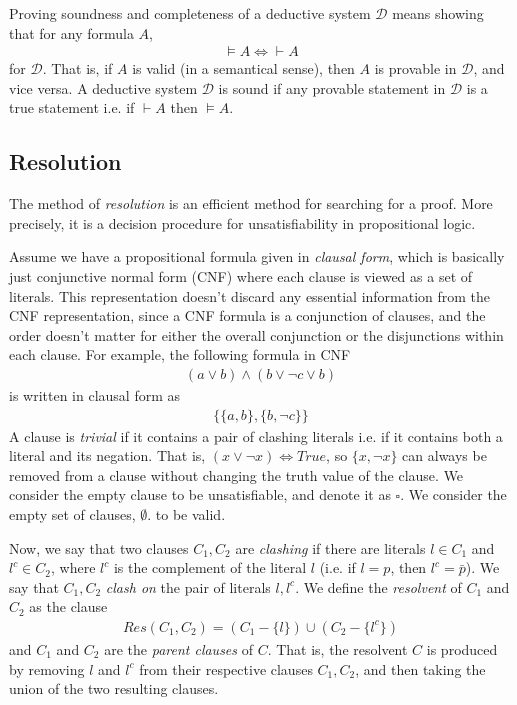 \documentclass[10pt]{article}
\begin{document}
Proving soundness and completeness of a deductive system $\mathcal{D}$ means showing that for any formula $A$, 
\begin{align*}
    \vDash A \iff \vdash A  
\end{align*}
for $\mathcal{D}$. That is, if $A$ is valid (in a semantical sense), then $A$ is provable in $\mathcal{D}$, and vice versa. A deductive system $\mathcal{D}$ is sound if any provable statement in $\mathcal{D}$ is a true statement i.e. if $\vdash A$ then  $\vDash A$.

\subsection{Resolution}

The method of \textit{resolution} is an efficient method for searching for a proof. More precisely, it is a decision procedure for unsatisfiability in propositional logic. 

Assume we have a propositional formula given in \textit{clausal form}, which is basically just conjunctive normal form (CNF) where each clause is viewed as a set of literals. This representation doesn't discard any essential information from the CNF representation, since a CNF formula is a conjunction of clauses, and the order doesn't matter for either the overall conjunction or the disjunctions within each clause. For example, the following formula in CNF
\begin{align*}
    (a \vee b) \wedge (b \vee \neg c \vee b)
\end{align*}
is written in clausal form as
\begin{align*}
    \{\{a,b\},\{b,\neg c\}\}
\end{align*}
A clause is \textit{trivial} if it contains a pair of clashing literals i.e. if it contains both a literal and its negation. That is, $(x \vee \neg x) \iff True$, so $\{x, \neg x\}$ can always be removed from a clause without changing the truth value of the clause. We consider the empty clause to be unsatisfiable, and denote it as $\square$. We consider the empty set of clauses, $\emptyset$. to be valid.

Now, we say that two clauses $C_1,C_2$ are \textit{clashing} if there are literals $l \in C_1$ and $l^c \in C_2$, where $l^c$ is the complement of the literal $l$ (i.e. if $l=p$, then $l^c=\bar{p}$). We say that $C_1,C_2$ \textit{clash on} the pair of literals $l,l^c$. We define the \textit{resolvent} of $C_1$ and $C_2$ as the clause 
\begin{align*}
Res(C_1,C_2) = (C_1 - \{l\}) \cup (C_2 - \{l^c\})    
\end{align*}
and $C_1$ and $C_2$ are the \textit{parent clauses} of $C$. That is, the resolvent $C$ is produced by removing $l$ and $l^c$ from their respective clauses $C_1,C_2$, and then taking the union of the two resulting clauses. 
\end{document}
